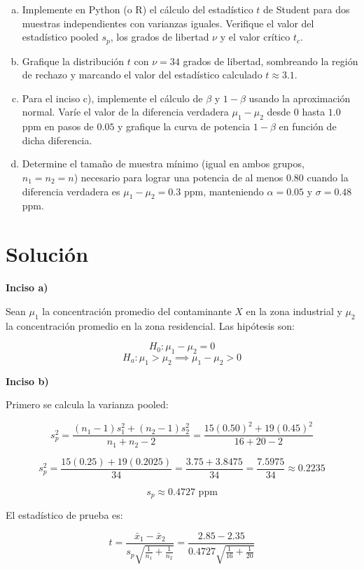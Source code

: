 \documentclass[a4paper]{article}
\begin{document}
\begin{enumerate}[a)]
    \item Implemente en Python (o R) el cálculo del estadístico $t$ de Student para dos muestras independientes con varianzas iguales. Verifique el valor del estadístico pooled $s_p$, los grados de libertad $\nu$ y el valor crítico $t_c$.

    \item Grafique la distribución $t$ con $\nu = 34$ grados de libertad, sombreando la región de rechazo y marcando el valor del estadístico calculado $t \approx 3.1$.

    \item Para el inciso c), implemente el cálculo de $\beta$ y $1-\beta$ usando la aproximación normal. Varíe el valor de la diferencia verdadera $\mu_1 - \mu_2$ desde $0$ hasta $1.0$ ppm en pasos de $0.05$ y grafique la curva de potencia $1-\beta$ en función de dicha diferencia.

    \item Determine el tamaño de muestra mínimo (igual en ambos grupos, $n_1 = n_2 = n$) necesario para lograr una potencia de al menos $0.80$ cuando la diferencia verdadera es $\mu_1 - \mu_2 = 0.3$ ppm, manteniendo $\alpha = 0.05$ y $\sigma = 0.48$ ppm.
\end{enumerate}

\section*{Solución}

\textbf{Inciso a)}

Sean $\mu_1$ la concentración promedio del contaminante $X$ en la zona industrial y $\mu_2$ la concentración promedio en la zona residencial. Las hipótesis son:

$$H_0: \mu_1 - \mu_2 = 0$$
$$H_a: \mu_1 > \mu_2 \implies \mu_1 - \mu_2 > 0$$

\textbf{Inciso b)}

Primero se calcula la varianza pooled:

$$s_p^2 = \frac{(n_1 - 1)s_1^2 + (n_2 - 1)s_2^2}{n_1 + n_2 - 2} = \frac{15(0.50)^2 + 19(0.45)^2}{16 + 20 - 2}$$

$$s_p^2 = \frac{15(0.25) + 19(0.2025)}{34} = \frac{3.75 + 3.8475}{34} = \frac{7.5975}{34} \approx 0.2235$$

$$s_p \approx 0.4727 \text{ ppm}$$

El estadístico de prueba es:

$$t = \frac{\bar{x}_1 - \bar{x}_2}{s_p \sqrt{\frac{1}{n_1} + \frac{1}{n_2}}} = \frac{2.85 - 2.35}{0.4727 \sqrt{\frac{1}{16} + \frac{1}{20}}}$$
\end{document}
